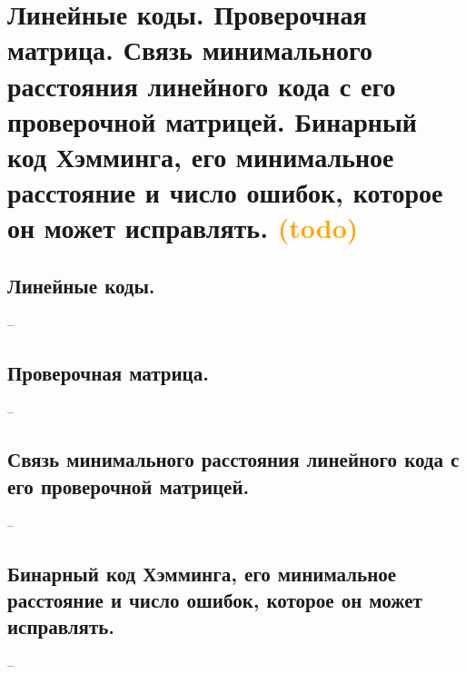 \section{Линейные коды. Проверочная матрица. Связь минимального расстояния линейного кода с его проверочной матрицей. Бинарный код Хэмминга, его минимальное расстояние и число ошибок, которое он может исправлять. \textcolor{orange}{(todo)}}

\subsection{Линейные коды.}
--

\subsection{Проверочная матрица.}
--

\subsection{Связь минимального расстояния линейного кода с его проверочной матрицей.}
--

\subsection{Бинарный код Хэмминга, его минимальное расстояние и число ошибок, которое он может исправлять.}
--
